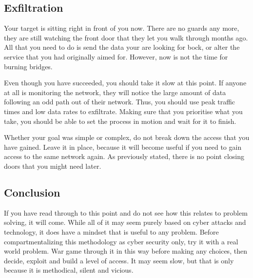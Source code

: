 		\subsection{Exfiltration}
			Your target is sitting right in front of you now. 
			There are no guards any more, they are still watching the front door that they let you walk through months ago. 
			All that you need to do is send the data your are looking for bock, or alter the service that you had originally aimed for. 
			However, now is not the time for burning bridges. 

			Even though you have succeeded, you should take it slow at this point. 
			If anyone at all is monitoring the network, they will notice the large amount of data following an odd path out of their network. 
			Thus, you should use peak traffic times and low data rates to exfiltrate. 
			Making sure that you prioritise what you take, you should be able to set the process in motion and wait for it to finish. 

			Whether your goal was simple or complex, do not break down the access that you have gained. 
			Leave it in place, because it will become useful if you need to gain access to the same network again. 
			As previously stated, there is no point closing doors that you might need later. 

		\subsection{Conclusion}
			If you have read through to this point and do not see how this relates to problem solving, it will come. 
			While all of it may seem purely based on cyber attacks and technology, it does have a mindset that is useful to any problem. 
			Before compartmentalizing this methodology as cyber security only, try it with a real world problem. 
			War game through it in this way before making any choices, then decide, exploit and build a level of access. 
			It may seem slow, but that is only because it is methodical, silent and vicious. 

